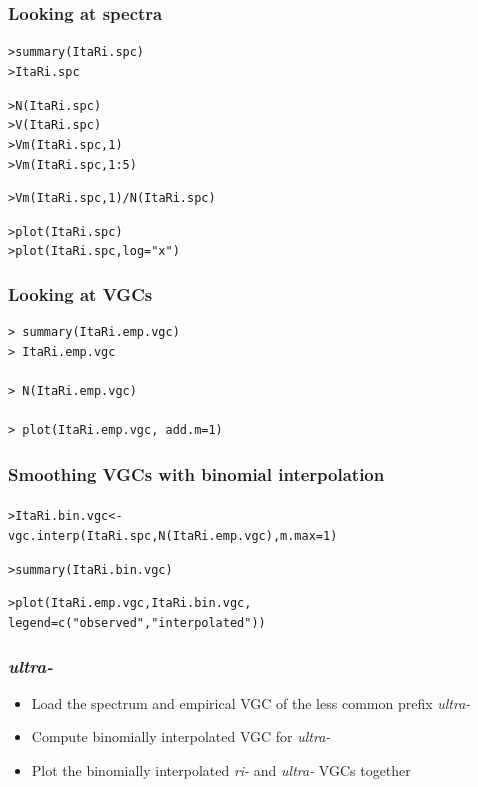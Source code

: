 \documentclass[t]{beamer} %
\begin{document}
\begin{frame}[fragile]
  \frametitle{Looking at spectra}

\begin{alltt}
> summary(ItaRi.spc)
> ItaRi.spc

> N(ItaRi.spc)
> V(ItaRi.spc)
> Vm(ItaRi.spc, 1)
> Vm(ItaRi.spc, 1:5)

> Vm(ItaRi.spc, 1) / N(ItaRi.spc)

> plot(ItaRi.spc)
> plot(ItaRi.spc, log="x")
\end{alltt}
\end{frame}

\begin{frame}[fragile]
  \frametitle{Looking at VGCs}

\begin{verbatim}
> summary(ItaRi.emp.vgc)
> ItaRi.emp.vgc

> N(ItaRi.emp.vgc)

> plot(ItaRi.emp.vgc, add.m=1)
\end{verbatim}
\end{frame}

\begin{frame}[fragile]
  \frametitle{Smoothing VGCs with binomial interpolation}
  \framesubtitle{\citep[for details, see][Sec. 2.6.1]{Baayen:01}}

\begin{alltt}
> ItaRi.bin.vgc <- 
  vgc.interp(ItaRi.spc, N(ItaRi.emp.vgc), m.max=1)

> summary(ItaRi.bin.vgc)

> plot(ItaRi.emp.vgc, ItaRi.bin.vgc,
       legend=c("observed", "interpolated"))
\end{alltt}


\end{frame}


\begin{frame}
  \frametitle{\emph{ultra-}}

  \begin{itemize}
  \item Load the spectrum and empirical VGC of the less common prefix \emph{ultra-}
  \item Compute binomially interpolated VGC for \emph{ultra-}
  \item Plot the binomially interpolated \emph{ri-} and \emph{ultra-}
    VGCs together
  \end{itemize}

\end{frame}
\end{document}
